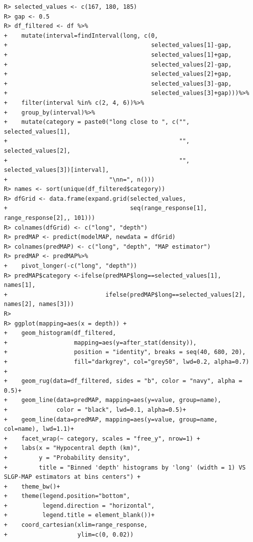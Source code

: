 \documentclass[
]{article}
\begin{document}
\begin{verbatim}
R> selected_values <- c(167, 180, 185)
R> gap <- 0.5
R> df_filtered <- df %>%
+    mutate(interval=findInterval(long, c(0, 
+                                         selected_values[1]-gap, 
+                                         selected_values[1]+gap, 
+                                         selected_values[2]-gap, 
+                                         selected_values[2]+gap, 
+                                         selected_values[3]-gap, 
+                                         selected_values[3]+gap)))%>%
+    filter(interval %in% c(2, 4, 6))%>%
+    group_by(interval)%>%
+    mutate(category = paste0("long close to ", c("", selected_values[1],
+                                                 "", selected_values[2],
+                                                 "", selected_values[3])[interval], 
+                             "\nn=", n()))
R> names <- sort(unique(df_filtered$category))
R> dfGrid <- data.frame(expand.grid(selected_values, 
+                                   seq(range_response[1], range_response[2],, 101)))
R> colnames(dfGrid) <- c("long", "depth")
R> predMAP <- predict(modelMAP, newdata = dfGrid)
R> colnames(predMAP) <- c("long", "depth", "MAP estimator")
R> predMAP <- predMAP%>%
+    pivot_longer(-c("long", "depth"))
R> predMAP$category <-ifelse(predMAP$long==selected_values[1], names[1],
+                            ifelse(predMAP$long==selected_values[2], names[2], names[3]))
R> 
R> ggplot(mapping=aes(x = depth)) +
+    geom_histogram(df_filtered,
+                   mapping=aes(y=after_stat(density)),
+                   position = "identity", breaks = seq(40, 680, 20),
+                   fill="darkgrey", col="grey50", lwd=0.2, alpha=0.7) +
+    geom_rug(data=df_filtered, sides = "b", color = "navy", alpha = 0.5)+
+    geom_line(data=predMAP, mapping=aes(y=value, group=name), 
+              color = "black", lwd=0.1, alpha=0.5)+
+    geom_line(data=predMAP, mapping=aes(y=value, group=name, col=name), lwd=1.1)+
+    facet_wrap(~ category, scales = "free_y", nrow=1) +
+    labs(x = "Hypocentral depth (km)",
+         y = "Probability density",
+         title = "Binned 'depth' histograms by 'long' (width = 1) VS SLGP-MAP estimators at bins centers") +
+    theme_bw()+
+    theme(legend.position="bottom",
+          legend.direction = "horizontal",
+          legend.title = element_blank())+
+    coord_cartesian(xlim=range_response,
+                    ylim=c(0, 0.02))
\end{verbatim}
\end{document}
